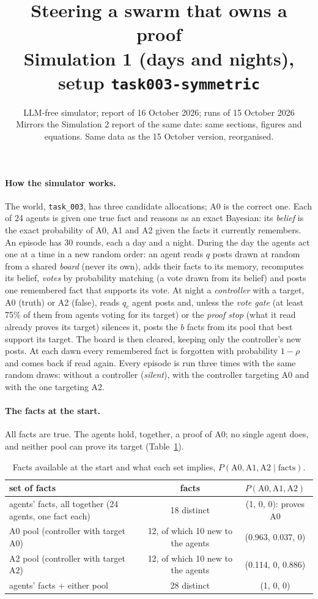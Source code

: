 \documentclass[10pt,a4paper]{article}
\title{\vspace{-1.2cm}\textbf{Steering a swarm that owns a proof}\\[2pt]
\large Simulation 1 (days and nights), setup \texttt{task003-symmetric}}
\author{LLM-free simulator; report of 16 October 2026; runs of 15 October 2026\\
\small Mirrors the Simulation 2 report of the same date: same sections, figures and equations. Same data as the 15 October version, reorganised.}
\date{}
\begin{document}
\maketitle
\vspace{-1cm}

\paragraph{How the simulator works.} The world, \texttt{task\_003}, has three candidate allocations; A0 is the
correct one. Each of 24 agents is given one true fact and reasons as an exact Bayesian: its \emph{belief} is the
exact probability of A0, A1 and A2 given the facts it currently remembers. An episode has 30 rounds, each a day
and a night. During the day the agents act one at a time in a new random order: an agent reads $q$ posts drawn at
random from a shared \emph{board} (never its own), adds their facts to its memory, recomputes its belief,
\emph{votes} by probability matching (a vote drawn from its belief) and posts one remembered fact that supports
its vote. At night a \emph{controller} with a target, A0 (truth) or A2 (false), reads $q_c$ agent posts and,
unless the \emph{vote gate} (at least 75\% of them from agents voting for its target) or the \emph{proof stop}
(what it read already proves its target) silences it, posts the $b$ facts from its pool that best support its
target. The board is then cleared, keeping only the controller's new posts. At each dawn every remembered fact is
forgotten with probability $1-\rho$ and comes back if read again. Every episode is run three times with the same
random draws: without a controller (\emph{silent}), with the controller targeting A0 and with the one targeting
A2.

\paragraph{The facts at the start.} All facts are true. The agents hold, together, a proof of A0; no single
agent does, and neither pool can prove its target (Table~\ref{tab:facts}).

\begin{table}[H]
\centering\small
\caption{Facts available at the start and what each set implies, $P(\text{A0}, \text{A1}, \text{A2} \mid \text{facts})$.}
\label{tab:facts}
\begin{tabular}{lcc}
\toprule
set of facts & facts & $P(\text{A0}, \text{A1}, \text{A2})$ \\
\midrule
agents' facts, all together (24 agents, one fact each) & 18 distinct & (1, 0, 0): proves A0 \\
A0 pool (controller with target A0) & 12, of which 10 new to the agents & (0.963, 0.037, 0) \\
A2 pool (controller with target A2) & 12, of which 10 new to the agents & (0.114, 0, 0.886) \\
agents' facts + either pool & 28 distinct & (1, 0, 0) \\
\bottomrule
\end{tabular}
\end{table}
\end{document}
